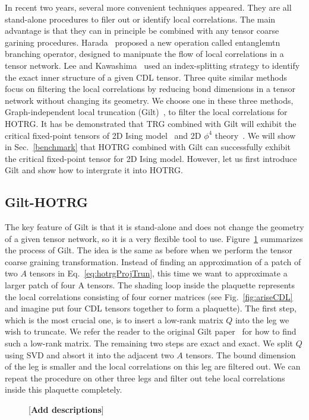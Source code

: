 \documentclass[aps,prb,reprint,superscriptaddress]{revtex4-2}
\begin{document}
In recent two years, several more convenient techniques appeared. They are
all stand-alone procedures to filer out or identify local correlations.
The main advantage is that they can in principle be combined with any
tensor coarse garining procedures. Harada~\cite{harada2018} proposed a
new operation called entanglemtn branching operator, designed to
manipuate the flow of local correlations in a tensor network. Lee and
Kawashima~\cite{tensor-ring} used an index-splitting strategy to
identify the exact inner structure of a given CDL tensor. Three quite
similar methods~\cite{tns,gilts,fet} focus on filtering the local
correlations by reducing bond dimensions in a tensor network without
changing its geometry. We choose one in these three methods,
Graph-independent local truncation (Gilt)~\cite{gilts}, to filter the local
correlations for HOTRG. It has be demonstrated that TRG combined with
Gilt will exhibit the critical fixed-point tensors of 2D Ising
model~\cite{gilts} and 2D $\phi^4$ theory~\cite{Delcamp2020}. We will
show in Sec.~\ref{benchmark} that HOTRG combined with Gilt can
successfully exhibit the critical fixed-point tensor for 2D Ising model.
However, let us first introduce Gilt and show how to intergrate it into
HOTRG.
%

\subsection{Gilt-HOTRG\label{gilt-hotrg}}
The key feature of Gilt is that it is stand-alone and does
not change the geometry of a given tensor network, so it is a very
flexible tool to use. Figure~\ref{fig:gilt} summarizes the process of
Gilt. The idea is the same as before when we perform the tensor coarse
graining transformation. Instead of finding an approximation of a patch
of two $A$ tensors in Eq.~\eqref{eq:hotrgProjTrun}, this time we want to
approximate a larger patch of four A tensors. The shading loop inside
the plaquette represents the local correlations consisting of four
corner matrices (see Fig.~\ref{fig:ariseCDL} and imagine put four CDL
tensors together to form a plaquette). The first step, which is the
most crucial one, is to insert a low-rank matrix $Q$ into the leg we
wish to truncate. We refer the reader to the original Gilt
paper~\cite{gilts} for how to find such a low-rank matrix. The remaining
two steps are exact and exact. We split $Q$ using SVD and absort it into
the adjacent two $A$ tensors. The bound dimension of the leg is smaller
and the local correlations on this leg are filtered out. We can repeat
the procedure on other three legs and filter out tehe local correlations
inside this plaquette completely.
%
\begin{figure}[h]
    \caption{\label{fig:gilt}[\textbf{Add descriptions}]}
\end{figure}
%
\end{document}
